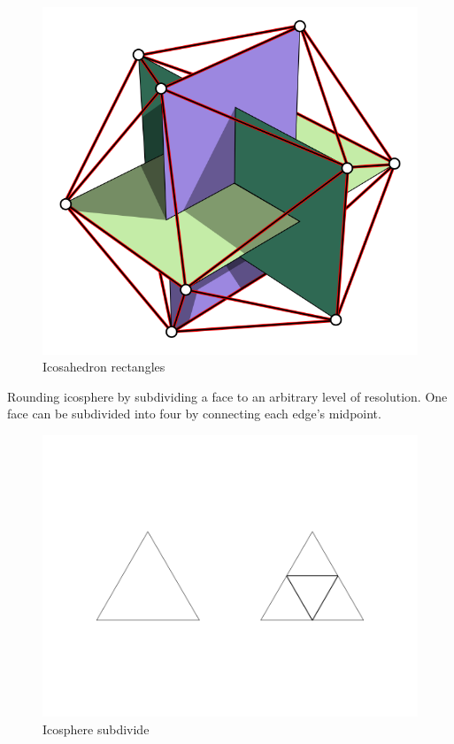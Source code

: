 \begin{figure}[H]
\caption[icosahedron-rectangles]{Icosahedron rectangles \parencite{wiki.icosahedron-rectangles.2006}}
\label{fig:icosahedron-rectangles}
\centering
\includegraphics[width=\linewidth]{Figures/icosahedron-rectangles.png}
\decoRule
\end{figure}

Rounding icosphere by subdividing a face to an arbitrary level of resolution. One face can be subdivided into four by connecting each edge's midpoint.

\begin{figure}[H]
\centering
\includegraphics[width=\linewidth]{Figures/icosphere-subdivide.png}
\decoRule
\caption[icosphere-subdivide]{Icosphere subdivide}
\end{figure}

